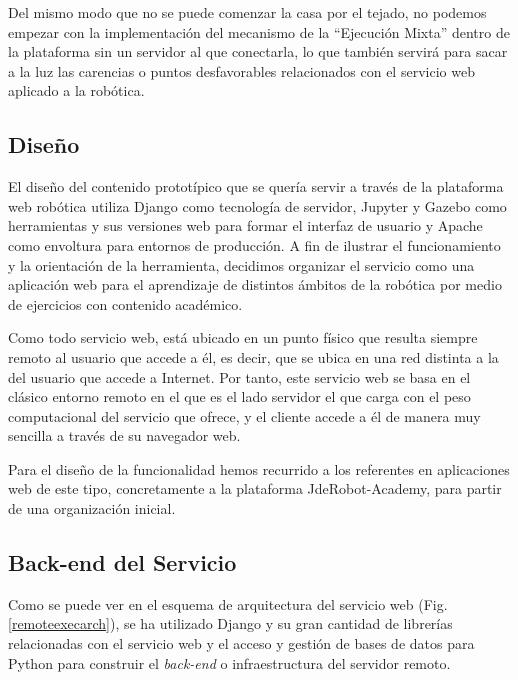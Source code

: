 Del mismo modo que no se puede comenzar la casa por el tejado, no podemos empezar con la implementación del mecanismo de la ``Ejecución Mixta'' dentro de la plataforma sin un servidor al que conectarla, lo que también servirá para sacar a la luz las carencias o puntos desfavorables relacionados con el servicio web aplicado a la robótica.

\subsection{Diseño}

El diseño del contenido prototípico que se quería servir a través de la plataforma web robótica utiliza Django como tecnología de servidor, Jupyter y Gazebo como herramientas y sus versiones web para formar el interfaz de usuario y Apache como envoltura para entornos de producción. A fin de ilustrar el funcionamiento y la orientación de la herramienta, decidimos organizar el servicio como una aplicación web para el aprendizaje de distintos ámbitos de la robótica por medio de ejercicios con contenido académico.

Como todo servicio web, está ubicado en un punto físico que resulta siempre remoto al usuario que accede a él, es decir, que se ubica en una red distinta a la del usuario que accede a Internet. Por tanto, este servicio web se basa en el clásico entorno remoto en el que es el lado servidor el que carga con el peso computacional del servicio que ofrece, y el cliente accede a él de manera muy sencilla a través de su navegador web.

Para el diseño de la funcionalidad hemos recurrido a los referentes en aplicaciones web de este tipo, concretamente a la plataforma JdeRobot-Academy, para partir de una organización inicial.

\subsection{Back-end del Servicio}

Como se puede ver en el esquema de arquitectura del servicio web (Fig. \ref{remoteexecarch}), se ha utilizado Django y su gran cantidad de librerías relacionadas con el servicio web y el acceso y gestión de bases de datos para Python para construir el \textit{back-end} o infraestructura del servidor remoto.

